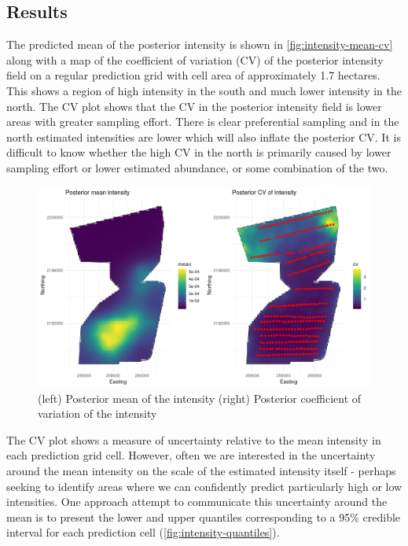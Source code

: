 \documentclass[preprint,12pt]{elsarticle}
\begin{document}
\subsection*{Results}

The predicted mean of the posterior intensity is shown in \autoref{fig:intensity-mean-cv} along with a map of the coefficient of variation (CV) of the posterior intensity field on a regular prediction grid with cell area of approximately 1.7 hectares.  This shows a region of high intensity in the south and much lower intensity in the north.  The CV plot shows that the CV in the posterior intensity field is lower areas with greater sampling effort.  There is clear preferential sampling and in the north estimated intensities are lower which will also inflate the posterior CV.  It is difficult to know whether the high CV in the north is primarily caused by lower sampling effort or lower estimated abundance, or some combination of the two.  

\begin{figure}
	\includegraphics[scale=0.5]{figures/intensity_mean_cv.png}
	\caption{(left) Posterior mean of the intensity (right) Posterior coefficient of variation of the intensity}
	\label{fig:intensity-mean-cv}
\end{figure}

The CV plot shows a measure of uncertainty relative to the mean intensity in each prediction grid cell.  However, often we are interested in the uncertainty around the mean intensity on the scale of the estimated intensity itself - perhaps seeking to identify areas where we can confidently predict particularly high or low intensities.  One approach attempt to communicate this uncertainty around the mean is to present the lower and upper quantiles corresponding to a 95\% credible interval for each prediction cell (\autoref{fig:intensity-quantiles}).
\end{document}
